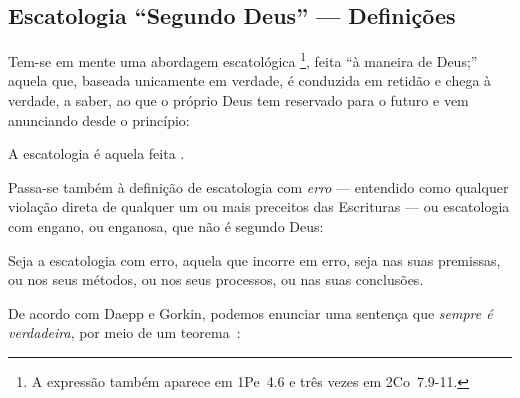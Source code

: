 

    \subsection{Escatologia ``Segundo Deus'' --- Definições}

    Tem-se em mente uma abordagem escatológica \footnote{A expressão   também  aparece
    em 1Pe~4.6 e três vezes em 2Co~7.9-11.}, feita ``à maneira de Deus;'' aquela que, baseada unicamente em verdade, é conduzida
    em retidão e chega à verdade, a saber, ao que o próprio Deus tem reservado para o futuro e vem anunciando desde o princípio:

    \begin{DEF}
        \label{def.esc.segDeus}
        A escatologia    é  aquela  feita  .
    \end{DEF}

    Passa-se também à definição de escatologia com \emph{erro} --- entendido como qualquer violação direta de qualquer um ou mais
    preceitos das Escrituras --- ou escatologia com engano, ou enganosa, que não é segundo Deus:

    \begin{DEF}
        \label{def.esc.comerro}
        Seja a escatologia com erro, a\-que\-la que incorre em erro, seja nas suas premissas, ou nos  seus  métodos,
        ou nos seus processos, ou nas suas conclusões.
    \end{DEF}

    De acordo com Daepp e Gorkin, podemos enunciar uma sentença que \emph{sempre é verdadeira}, por meio de um
    teorema~\cite[p.~17]{2011-DaeppU+GorkinP-Springer}:

